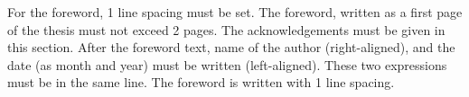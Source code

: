 For the foreword, 1 line spacing must be set. The foreword, written
as a first page of the thesis must not exceed 2 pages. The 
acknowledgements must be given in this section.
After the foreword text, name of the author (right-aligned), and
the date (as month and year) must be written (left-aligned). These
two expressions must be in the same line. The foreword is
written with 1 line spacing.